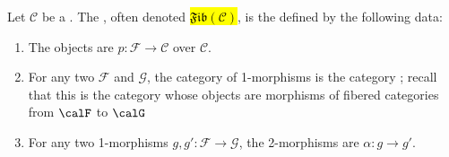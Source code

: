 \begin{definition}
\label{definition:2_category_of_categories_fibered_over_a_category}
Let $\mathcal{C}$ be a . 
The , often denoted \hl{$\mathfrak{Fib}(\mathcal{C})$}, is the  defined by the following data:
\begin{enumerate}
    \item The objects are  $p: \mathcal{F} \to \mathcal{C}$ over $\mathcal{C}$.
    \item For any two  $\mathcal{F}$ and $\mathcal{G}$, the category of 1-morphisms is the category ; recall that this is the category whose objects are morphisms of fibered categories from $\calF$ to $\calG$
    \item For any two 1-morphisms $g, g': \mathcal{F} \to \mathcal{G}$, the 2-morphisms are  $\alpha: g \to g'$.
\end{enumerate}
\end{definition}